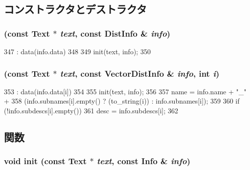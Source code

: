 \subsection{コンストラクタとデストラクタ}
\hypertarget{structStats_1_1DistPrint_a33e2dab8b71e7ee9e2872688d12abc35}{
\subsubsection[{DistPrint}]{ (const {\bf Text} $\ast$ {\em text}, \/  const {\bf DistInfo} \& {\em info})}}
\label{structStats_1_1DistPrint_a33e2dab8b71e7ee9e2872688d12abc35}



\begin{DoxyCode}
347     : data(info.data)
348 {
349     init(text, info);
350 }
\end{DoxyCode}
\hypertarget{structStats_1_1DistPrint_a81b7fc26776fe520382bac4ae466fff7}{
\subsubsection[{DistPrint}]{ (const {\bf Text} $\ast$ {\em text}, \/  const {\bf VectorDistInfo} \& {\em info}, \/  int {\em i})}}
\label{structStats_1_1DistPrint_a81b7fc26776fe520382bac4ae466fff7}



\begin{DoxyCode}
353     : data(info.data[i])
354 {
355     init(text, info);
356 
357     name = info.name + "_" +
358         (info.subnames[i].empty() ? (to_string(i)) : info.subnames[i]);
359 
360     if (!info.subdescs[i].empty())
361         desc = info.subdescs[i];
362 }
\end{DoxyCode}


\subsection{関数}
\hypertarget{structStats_1_1DistPrint_a5c205569f811ccef04fc7ddaf47e3add}{
\subsubsection[{init}]{\setlength{\rightskip}{0pt plus 5cm}void init (const {\bf Text} $\ast$ {\em text}, \/  const {\bf Info} \& {\em info})}}
\label{structStats_1_1DistPrint_a5c205569f811ccef04fc7ddaf47e3add}



